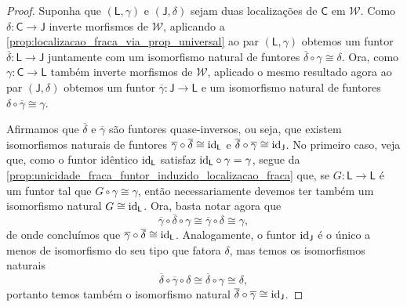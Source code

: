 \begin{proof}
  Suponha que $(\mathsf{L},\gamma)$ e $(\mathsf{J},\delta)$ sejam duas localizações de $\mathsf{C}$ em $\mathcal{W}$.
  Como $\delta: \mathsf{C} \to \mathsf{J}$ inverte morfismos de $\mathcal{W}$, aplicando a \cref{prop:localizacao_fraca_via_prop_universal} ao par $(\mathsf{L},\gamma)$ obtemos um funtor $\overline{\delta}: \mathsf{L} \to \mathsf{J}$ juntamente com um isomorfismo natural de funtores $\overline{\delta} \circ \gamma \cong \delta$.
  Ora, como $\gamma: \mathsf{C} \to \mathsf{L}$ também inverte morfismos de $\mathcal{W}$, aplicado o mesmo resultado agora ao par $(\mathsf{J},\delta)$ obtemos um funtor $\overline{\gamma}: \mathsf{J} \to \mathsf{L}$ e um isomorfismo natural de funtores $\delta \circ \overline{\gamma} \cong \gamma$.

  Afirmamos que $\overline{\delta}$ e $\overline{\gamma}$ são funtores quase-inversos, ou seja, que existem isomorfismos naturais de funtores $\overline{\gamma} \circ \overline{\delta} \cong \mathrm{id}_{\mathsf{L}}$ e $\overline{\delta} \circ \overline{\gamma} \cong \mathrm{id}_{\mathsf{J}}$.
  No primeiro caso, veja que, como o funtor idêntico $\mathrm{id}_{\mathsf{L}}$ satisfaz $\mathrm{id}_{\mathsf{L}} \circ \gamma = \gamma$, segue da \cref{prop:unicidade_fraca_funtor_induzido_localizacao_fraca} que, se $G: \mathsf{L} \to \mathsf{L}$ é um funtor tal que $G \circ \gamma \cong \gamma$, então necessariamente devemos ter também um isomorfismo natural $G \cong \mathrm{id}_{\mathsf{L}}$.
  Ora, basta notar agora que
  \begin{displaymath}
    \overline{\gamma} \circ \overline{\delta} \circ \gamma \cong \overline{\gamma} \circ \delta \cong \gamma,
  \end{displaymath}
  de onde concluímos que $\overline{\gamma} \circ \overline{\delta} \cong \mathrm{id}_{\mathsf{L}}$.
  Analogamente, o funtor $\mathrm{id}_{\mathsf{J}}$ é o único a menos de isomorfismo do seu tipo que fatora $\delta$, mas temos os isomorfismos naturais
  \begin{displaymath}
    \overline{\delta} \circ \overline{\gamma} \circ \delta \cong \overline{\delta} \circ \gamma \cong \delta,
  \end{displaymath}
  portanto temos também o isomorfismo natural $\overline{\delta} \circ \overline{\gamma} \cong \mathrm{id}_{\mathsf{J}}$.
\end{proof}

